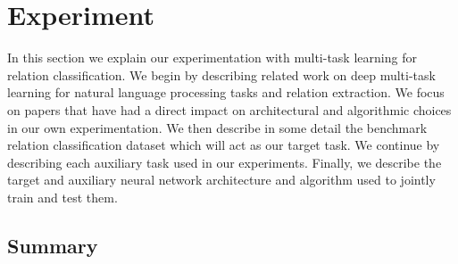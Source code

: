 \chapter{Experiment}
In this section we explain our experimentation with multi-task learning for relation classification. We begin by describing related work on deep multi-task learning for natural language processing tasks and relation extraction. We focus on papers that have had a direct impact on architectural and algorithmic choices in our own experimentation. We then describe in some detail the benchmark relation classification dataset which will act as our target task. We continue by describing each auxiliary task used in our experiments. Finally, we describe the target and auxiliary neural network architecture and algorithm used to jointly train and test them.






\section{Summary}